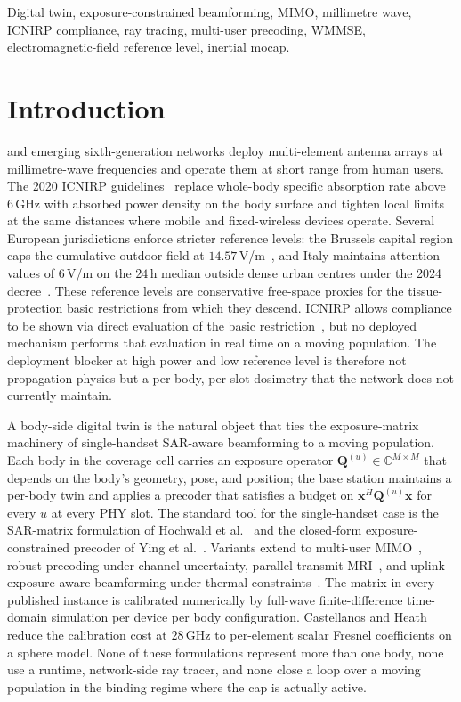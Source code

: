 \documentclass[journal,twocolumn,10pt]{IEEEtran}
\theoremstyle{plain}
\theoremstyle{remark}
\newcommand{\xx}{\mathbf{x}}
\newcommand{\Qmat}{\mathbf{Q}}
\newcommand{\Complex}{\mathbb{C}}
\begin{document}
\begin{IEEEkeywords}
Digital twin, exposure-constrained beamforming, MIMO, millimetre wave,
ICNIRP compliance, ray tracing, multi-user precoding, WMMSE,
electromagnetic-field reference level, inertial mocap.
\end{IEEEkeywords}

\IEEEpeerreviewmaketitle


\section{Introduction}\label{sec:intro}
 and emerging sixth-generation
networks deploy multi-element antenna arrays at millimetre-wave
frequencies and operate them at short range from human users. The
2020 ICNIRP guidelines~\cite{ICNIRP2020} replace whole-body specific
absorption rate above $6\,$GHz with absorbed power density on the
body surface and tighten local limits at the same distances where
mobile and fixed-wireless devices operate. Several European
jurisdictions enforce stricter reference levels: the Brussels capital
region caps the cumulative outdoor field at
$14.57\,$V/m~\cite{BrusselsArrete2007,BrusselsArrete2024}, and Italy
maintains attention values of $6\,$V/m on the $24\,$h median outside
dense urban centres under the 2024 decree~\cite{ItalyDL}. These
reference levels are conservative free-space proxies for the
tissue-protection basic restrictions from which they descend.
ICNIRP allows compliance to be shown via direct evaluation of the
basic restriction~\cite{IEC62232}, but no deployed mechanism
performs that evaluation in real time on a moving population. The
deployment blocker at high power and low reference level is therefore
not propagation physics but a per-body, per-slot dosimetry that the
network does not currently maintain.

A body-side digital twin is the natural object that ties the
exposure-matrix machinery of single-handset SAR-aware beamforming
to a moving population. Each body in the coverage cell carries an
exposure operator $\Qmat^{(u)} \in \Complex^{M\times M}$ that depends
on the body's geometry, pose, and position; the base station maintains
a per-body twin and applies a precoder that satisfies a budget on
$\xx^H \Qmat^{(u)} \xx$ for every $u$ at every PHY slot. The standard
tool for the single-handset case is the SAR-matrix formulation of
Hochwald et al.~\cite{Hochwald2014} and the closed-form
exposure-constrained precoder of Ying et al.~\cite{Ying2015}. Variants
extend to multi-user MIMO~\cite{Ying2017}, robust precoding under
channel uncertainty, parallel-transmit
MRI~\cite{MeliadoSAR2020,GokyarpTx2023}, and uplink exposure-aware
beamforming under thermal constraints~\cite{ZhouUL2026}. The matrix
in every published instance is calibrated numerically by full-wave
finite-difference time-domain simulation per device per body
configuration. Castellanos and Heath~\cite{Castellanos2020} reduce the
calibration cost at $28\,$GHz to per-element scalar Fresnel
coefficients on a sphere model. None of these formulations represent
more than one body, none use a runtime, network-side ray tracer, and
none close a loop over a moving population in the binding regime
where the cap is actually active.
\end{document}
